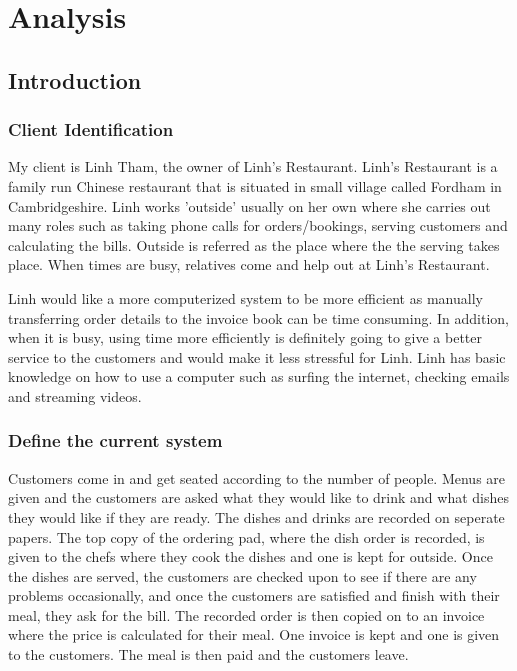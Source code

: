 \chapter{Analysis}

\section{Introduction}

\subsection{Client Identification}

My client is Linh Tham, the owner of Linh's Restaurant. Linh's Restaurant is a family run Chinese restaurant that is situated in small village called Fordham in Cambridgeshire.
 Linh works 'outside' usually on her own where she carries out many roles such as taking phone calls for orders/bookings, serving customers and calculating the bills. Outside is referred as the place where the the serving takes place. When times are busy, relatives come and help out at Linh's Restaurant.

Linh would like a more computerized system to be more efficient as manually transferring order details to the invoice book  can be time consuming. In addition, when it is busy, using time
more efficiently is definitely going to give a better service to the customers and would make it less stressful for Linh. Linh has basic knowledge on how to use a computer such as surfing the internet, checking emails and streaming videos.

\subsection{Define the current system}

Customers come in and get seated according to the number of people. Menus are given and the customers are asked what they would like to drink and what dishes they would like if they are ready. The dishes and drinks are recorded on seperate papers. The top copy of the ordering pad, where the dish order is recorded, is given to the chefs where they cook the dishes and one 
is kept for outside.  Once the dishes are served, the customers are checked upon to see if there are any problems occasionally, and once the customers are satisfied and finish with their meal, they ask for the bill. The recorded order is then copied on to an invoice where the price is calculated for their meal. One invoice is kept
and one is given to the customers. The meal is then paid and the customers leave.

